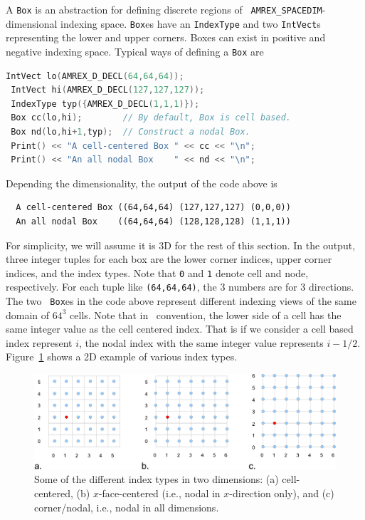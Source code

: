 {A {\tt Box} is an abstraction for defining discrete regions of {\tt
  AMREX\_SPACEDIM}-dimensional indexing space.  {\tt Box}es have an
{\tt IndexType} and two {\tt IntVect}s representing the lower and
upper corners.  Boxes can exist in positive and negative indexing
space.   Typical ways of defining a {\tt Box} are
\begin{lstlisting}[language=cpp]
 IntVect lo(AMREX_D_DECL(64,64,64));
 IntVect hi(AMREX_D_DECL(127,127,127));
 IndexType typ({AMREX_D_DECL(1,1,1)});
 Box cc(lo,hi);        // By default, Box is cell based.
 Box nd(lo,hi+1,typ);  // Construct a nodal Box.
 Print() << "A cell-centered Box " << cc << "\n";
 Print() << "An all nodal Box    " << nd << "\n";
\end{lstlisting}
Depending the dimensionality, the output of the code above is
\begin{verbatim}
  A cell-centered Box ((64,64,64) (127,127,127) (0,0,0))
  An all nodal Box    ((64,64,64) (128,128,128) (1,1,1))
\end{verbatim}
For simplicity, we will assume it is 3D for the rest of this section.
In the output, three integer tuples for each box are the lower corner
indices, upper corner indices, and the index types.  Note that {\tt 0}
and {\tt 1} denote cell and node, respectively.  For each tuple like
{\tt (64,64,64)}, the 3 numbers are for 3 directions.  The two {\tt
  Box}es in the code above represent different indexing views of the
same domain of $64^3$ cells.  Note that in \amrex\ convention, the
lower side of a cell has the same integer value as the cell centered
index.  That is if we consider a cell based index represent $i$, the
nodal index with the same integer value represents $i-1/2$.
Figure~\ref{fig:basics:indextypes} shows a 2D example of various index
types.  

\begin{figure}
  \centering
  \includegraphics[width=5in]{./Basics/indextypes.pdf}
  \caption{\label{fig:basics:indextypes} Some of the different index
    types in two dimensions: (a) cell-centered, (b) $x$-face-centered
    (i.e., nodal in $x$-direction only), and (c) corner/nodal,
    i.e., nodal in all dimensions.}
\end{figure}

}
